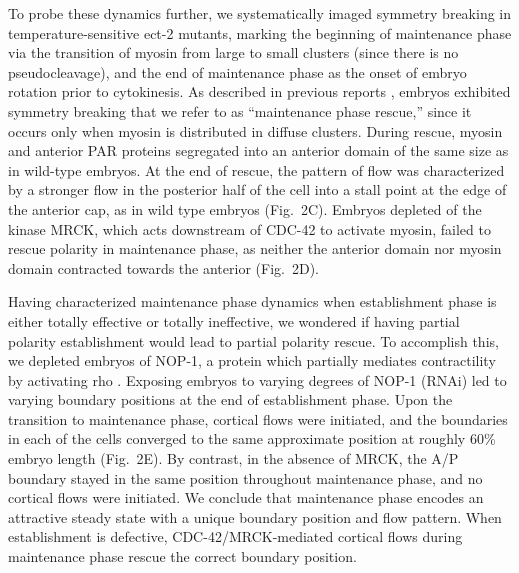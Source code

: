 \documentclass[11pt]{article}
\newcommand{\6}[1]{#1_{\text{6}}}
\newcommand{\3}[1]{#1_{\text{3}}}
\begin{document}
To probe these dynamics further, we systematically imaged symmetry breaking in temperature-sensitive ect-2 mutants, marking the beginning of maintenance phase via the transition of myosin from large to small clusters (since there is no pseudocleavage), and the end of maintenance phase as the onset of embryo rotation prior to cytokinesis. As described in previous reports \citep{zonies2010symmetry}, embryos exhibited symmetry breaking that we refer to as ``maintenance phase rescue,'' since it occurs only when myosin is distributed in diffuse clusters. During rescue, myosin and anterior PAR proteins segregated into an anterior domain of the same size as in wild-type embryos. At the end of rescue, the pattern of flow was characterized by a stronger flow in the posterior half of the cell into a stall point at the edge of the anterior cap, as in wild type embryos (Fig.\ 2C). Embryos depleted of the kinase MRCK, which acts downstream of CDC-42 to activate myosin, failed to rescue polarity in maintenance phase, as neither the anterior domain nor myosin domain contracted towards the anterior (Fig.\ 2D).

Having characterized maintenance phase dynamics when establishment phase is either totally effective or totally ineffective, we wondered if having partial polarity establishment would lead to partial polarity rescue. To accomplish this, we depleted embryos of NOP-1, a protein which partially mediates contractility by activating rho \citep{tse2012rhoa}. Exposing embryos to varying degrees of NOP-1 (RNAi) led to varying boundary positions at the end of establishment phase. Upon the transition to maintenance phase, cortical flows were initiated, and the boundaries in each of the cells converged to the same approximate position at roughly 60\% embryo length (Fig.\ 2E). By contrast, in the absence of MRCK, the A/P boundary stayed in the same position throughout maintenance phase, and no cortical flows were initiated. We conclude that maintenance phase encodes an attractive steady state with a unique boundary position and flow pattern. When establishment is defective, CDC-42/MRCK-mediated cortical flows during maintenance phase rescue the correct boundary position.
\end{document}
